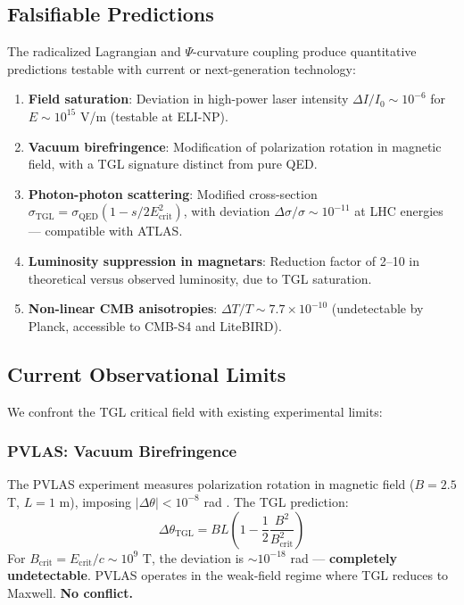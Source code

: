 \documentclass[12pt,a4paper,twoside]{article}
\newcommand{\Psifield}{\Psi}
\newcommand{\Ecrit}{E_{\text{crit}}}
\begin{document}
\subsection{Falsifiable Predictions}

The radicalized Lagrangian and $\Psifield$-curvature coupling produce quantitative predictions testable with current or next-generation technology:

\begin{enumerate}[nosep]
\item \textbf{Field saturation}: Deviation in high-power laser intensity $\Delta I/I_0 \sim 10^{-6}$ for $E \sim 10^{15}$ V/m (testable at ELI-NP).

\item \textbf{Vacuum birefringence}: Modification of polarization rotation in magnetic field, with a TGL signature distinct from pure QED.

\item \textbf{Photon-photon scattering}: Modified cross-section $\sigma_{\text{TGL}} = \sigma_{\text{QED}}\!\left(1 - s/2\Ecrit^2\right)$, with deviation $\Delta\sigma/\sigma \sim 10^{-11}$ at LHC energies --- compatible with ATLAS.

\item \textbf{Luminosity suppression in magnetars}: Reduction factor of 2--10 in theoretical versus observed luminosity, due to TGL saturation.

\item \textbf{Non-linear CMB anisotropies}: $\Delta T/T \sim 7.7 \times 10^{-10}$ (undetectable by Planck, accessible to CMB-S4 and LiteBIRD).
\end{enumerate}



\subsection{Current Observational Limits}

We confront the TGL critical field with existing experimental limits:

\subsubsection{PVLAS: Vacuum Birefringence}

The PVLAS experiment measures polarization rotation in magnetic field ($B = 2.5$ T, $L = 1$ m), imposing $|\Delta\theta| < 10^{-8}$ rad \cite{PVLAS2015}. The TGL prediction:
\begin{equation}
\Delta\theta_{\text{TGL}} = BL\left(1 - \frac{1}{2}\frac{B^2}{B_{\text{crit}}^2}\right)
\label{eq:pvlas_prediction}
\end{equation}
For $B_{\text{crit}} = \Ecrit/c \sim 10^9$ T, the deviation is $\sim 10^{-18}$ rad --- \textbf{completely undetectable}. PVLAS operates in the weak-field regime where TGL reduces to Maxwell. \textbf{No conflict.}
\end{document}
